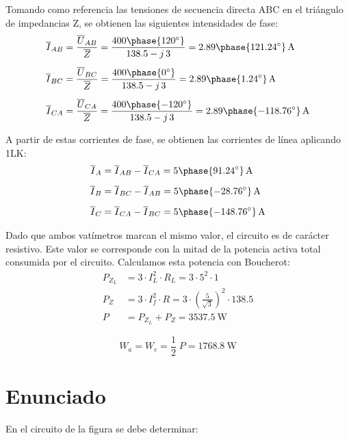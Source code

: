\vspace{2mm}
Tomando como referencia las tensiones de secuencia directa ABC
en el triángulo de impedancias Z, se obtienen las siguientes
intensidades de fase:
\begin{align*}
  \overline{I}_{AB} &= \frac{\overline{U}_{AB}}{\overline{Z}} = \frac{400\phase{\ang{120}}}{138.5 - j\,3} = {2.89\phase{121.24^\circ}}\,\unit{\ampere}\\[5pt]
  \overline{I}_{BC} &= \frac{\overline{U}_{BC}}{\overline{Z}} = \frac{400\phase{\ang{0}}}{138.5 - j\,3} = {2.89\phase{1.24^\circ}}\,\unit{\ampere}\\[5pt]
  \overline{I}_{CA} &= \frac{\overline{U}_{CA}}{\overline{Z}} = \frac{400\phase{\ang{-120}}}{138.5 - j\,3} = {2.89\phase{-118.76^\circ}}\,\unit{\ampere}
\end{align*}

A partir de estas corrientes de fase, se obtienen las corrientes de línea aplicando 1LK:
\begin{align*}
  \overline{I}_{A} &= \overline{I}_{AB} - \overline{I}_{CA} = {5\phase{91.24^\circ}}\,\unit{\ampere}\\[5pt]
  \overline{I}_{B} &= \overline{I}_{BC} - \overline{I}_{AB} = {5\phase{-28.76^\circ}}\,\unit{\ampere}\\[5pt]
  \overline{I}_{C} &= \overline{I}_{CA} - \overline{I}_{BC} = {5\phase{-148.76^\circ}}\,\unit{\ampere}
\end{align*}



Dado que ambos vatímetros marcan el mismo valor, el circuito es
de carácter resistivo. Este valor se corresponde con la mitad de la potencia
activa total consumida por el circuito. Calculamos esta potencia con Boucherot:
\begin{align*}
  P_{Z_L} &= 3 \cdot I_L^2 \cdot R_L = 3 \cdot 5^2 \cdot 1\\[1pt]
  P_Z &= 3 \cdot I_f^2 \cdot R = 3 \cdot \left(\frac{5}{\sqrt3}\right)^2 \cdot 138.5\\[3pt]
  P &= P_{Z_L} + P_{Z} = \SI{3537.5}{\watt}
\end{align*}

\[
  W_a = W_c = \frac{1}{2} \; P = \SI{1768.8}{\watt}
\]



\section{Enunciado}

En el circuito de la figura se debe determinar:

